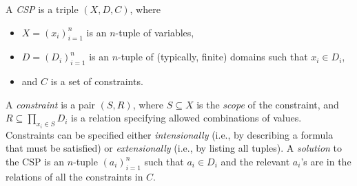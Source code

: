 \begin{definition}
  A \emph{CSP} is a triple $(X, D, C)$, where
  \begin{itemize}
    \item $X = {(x_i)}_{i=1}^n$ is an $n$-tuple of variables,
    \item $D = {(D_i)}_{i=1}^n$ is an $n$-tuple of (typically, finite) domains
          such that $x_i \in D_i$,
    \item and $C$ is a set of constraints.
  \end{itemize}
  A \emph{constraint} is a pair $(S, R)$, where $S \subseteq X$ is the
  \emph{scope} of the constraint, and $R \subseteq \prod_{x_i \in S} D_i$ is a
  relation specifying allowed combinations of values. Constraints can be
  specified either \emph{intensionally} (i.e., by describing a formula that must
  be satisfied) or \emph{extensionally} (i.e., by listing all tuples). A
  \emph{solution} to the CSP is an $n$-tuple ${(a_i)}_{i=1}^n$ such that
  $a_i \in D_i$ and the relevant $a_i$'s are in the relations of all the
  constraints in $C$.
\end{definition}

